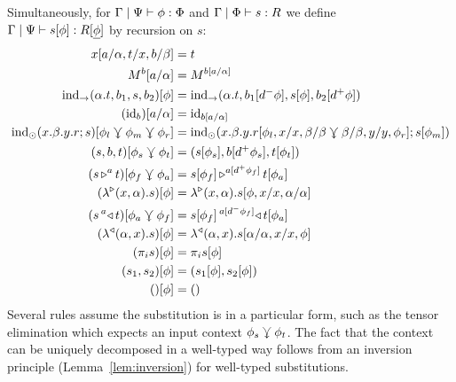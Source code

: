 \documentclass{llncs}
\begin{document}
\begin{definition}
  Simultaneously,
  for
  $\Gamma \pipe \Psi \vdash \phi : \Phi$
  and 
  $\Gamma \pipe \Phi \vdash s : R$ we define\\
  $\Gamma \pipe \Psi \vdash s[\phi] : R [ \underline \phi ]$ by recursion on $s$:
  \begin{align*}
    x[a/\alpha,t/x,b/\beta] &= t\\
    \pendappXtoY M b[a/\alpha] &= \pendappXtoY M {b[a/\alpha]}\\
    {\punitelimkontZatABC {\alpha. t}{b_1} s {b_2}}[\phi] &=
    {\punitelimkontZatABC {\alpha. t}{b_1[d^-\phi]} {s[\phi]} {b_2[d^+\phi]}}\\
    (\punitrefl b)[a/\alpha] &= \punitrefl {b[a/\alpha]}\\
    {\tensorelimWkontZ s {x.\beta.y.r}[\phi_l\jnctx\phi_m\jnctx\phi_r]} &=
    \tensorelimWkontZ {s[\phi_m]} {x.\beta.y. r[\phi_l,x/x,\beta/\beta \jnctx \beta/\beta,y/y,\phi_r]}\\
    {\tensorintroatXwithYandZ b s t}[\phi_s \jnctx \phi_t] &= \tensorintroatXwithYandZ {b[d^+\phi_s]} {s[\phi_s]} {t[\phi_t]}\\
    {(\homrappXtoYatZ s t a)}[\phi_f\jnctx \phi_a] &=
    {\homrappXtoYatZ {s[\phi_f]} {t[\phi_a]} {a[d^+\phi_f]}}\\
    {(\homrlambdaXatYdotZ {x}{\alpha} s)}[\phi] &=
    {\homrlambdaXatYdotZ {x}{\alpha} {s[\phi,x/x,\alpha/\alpha]}}\\
    {(\homlappXtoYatZ t s a)}[\phi_a\jnctx \phi_f] &=
    {\homlappXtoYatZ {t[\phi_a]} {s[\phi_f]} {a[d^-\phi_f]}}\\
    {(\homllambdaXatYdotZ {x}{\alpha} s)}[\phi] &=
    {\homllambdaXatYdotZ {x}{\alpha} {s[\alpha/\alpha,x/x,\phi]}}\\
    (\pi_i s)[\phi] &= \pi_i s[\phi]\\
    (s_1,s_2)[\phi] &= (s_1[\phi], s_2[\phi])\\
    ()[\phi] &= ()
  \end{align*}
  Several rules assume the substitution is in a particular form, such
  as the tensor elimination which expects an input context
  $\phi_s\jnctx\phi_t$. The fact that the context can be uniquely
  decomposed in a well-typed way follows from an inversion principle (Lemma~\ref{lem:inversion})
  for well-typed substitutions.


\end{definition}
\end{document}
